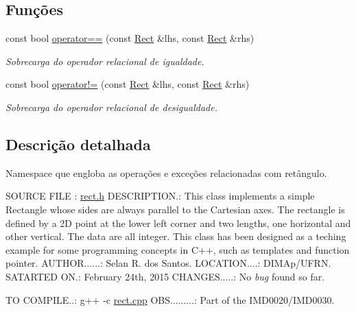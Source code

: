\subsection*{Funções}
\begin{DoxyCompactItemize}
\item 
const bool \hyperlink{namespacerectangle_ac0f53cc7302582a688e8a78390ef0efe}{operator==} (const \hyperlink{classrectangle_1_1Rect}{Rect} \&lhs, const \hyperlink{classrectangle_1_1Rect}{Rect} \&rhs)
\begin{DoxyCompactList}\small\item\em Sobrecarga do operador relacional de igualdade. \end{DoxyCompactList}\item 
const bool \hyperlink{namespacerectangle_a51e2779806c67db6f34c78059f57e755}{operator!=} (const \hyperlink{classrectangle_1_1Rect}{Rect} \&lhs, const \hyperlink{classrectangle_1_1Rect}{Rect} \&rhs)
\begin{DoxyCompactList}\small\item\em Sobrecarga do operador relacional de desigualdade. \end{DoxyCompactList}\end{DoxyCompactItemize}


\subsection{Descrição detalhada}
Namespace que engloba as opera\c{c}\~{o}es e exce\c{c}\~{o}es relacionadas com ret\^{a}ngulo. 
\begin{DoxyPre}
SOURCE FILE : \hyperlink{rect_8h}{rect.h}
DESCRIPTION.: This class implements a simple Rectangle whose sides are
              always parallel to the Cartesian axes.
              The rectangle is defined by a 2D point at the lower left
              corner and two lengths, one horizontal and other vertical.
              The data are all integer.
              This class has been designed as a teching example for some
              programming concepts in C++, such as templates and function
              pointer.
AUTHOR......: Selan R. dos Santos.
LOCATION....: DIMAp/UFRN.
SATARTED ON.: February 24th, 2015
CHANGES.....: No {\itshape bug} found so far.\end{DoxyPre}



\begin{DoxyPre}TO COMPILE..: g++ -c \hyperlink{rect_8cpp}{rect.cpp}
OBS.........: Part of the IMD0020/IMD0030.\end{DoxyPre}




